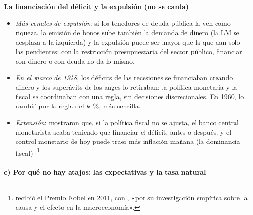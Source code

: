 \documentclass[11pt]{article}
\begin{document}
\begin{anotaciones}
\textbf{La financiación del déficit y la expulsión (no se canta)}
\begin{itemize}
\item \emph{Más canales de expulsión}: si los tenedores de deuda pública la ven como riqueza, la emisión de bonos sube también la demanda de dinero (la LM se desplaza a la izquierda) y la expulsión puede ser mayor que la que dan solo las pendientes; con la restricción presupuestaria del sector público, financiar con dinero o con deuda no da lo mismo\nocite{BlinderSolow1973Analytical}.
\item \emph{En el marco de 1948}, los déficits de las recesiones se financiaban creando dinero y los superávits de los auges lo retiraban: la política monetaria y la fiscal se coordinaban con una regla, sin decisiones discrecionales\nocite{Friedman1948Framework}. En 1960,  lo cambió por la regla del $k$~\%, más sencilla\nocite{Friedman1960Program}.
\item \emph{Extensión}: \textcite{SargentWallace1981} mostraron que, si la política fiscal no se ajusta, el banco central monetarista acaba teniendo que financiar el déficit, antes o después, y el control monetario de hoy puede traer más inflación mañana (la dominancia fiscal) .\footnote{ recibió el Premio Nobel en 2011, con , «por su investigación empírica sobre la causa y el efecto en la macroeconomía»\nocite{Nobel2011SargentSims}.}
\end{itemize}
\end{anotaciones}

\paragraph{c) Por qué no hay atajos: las expectativas y la tasa natural}\label{sec:politica-expectativas}
\end{document}
